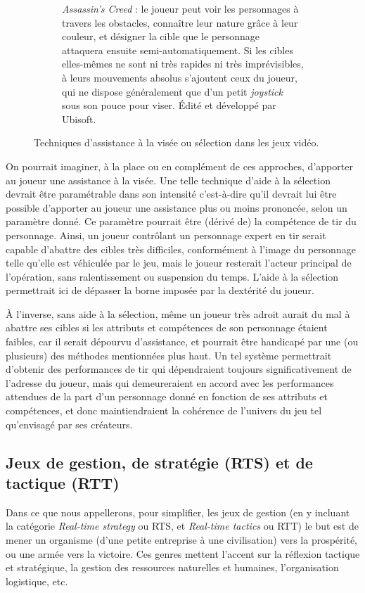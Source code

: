 \begin{figure}[!htbp]
\begin{subfigure}[t]{0.50\textwidth}
			\caption[Système \emph{Eagle Vision} dans le jeu \emph{Assassin's Creed}] {\emph{Assassin's Creed} : le joueur peut voir les personnages à travers les obstacles, connaître leur nature grâce à leur couleur, et désigner la cible que le personnage attaquera ensuite semi-automatiquement. Si les cibles elles-mêmes ne sont ni très rapides ni très imprévisibles, à leurs mouvements absolus s'ajoutent ceux du joueur, qui ne dispose généralement que d'un petit \emph{joystick} sous son pouce pour viser. Édité et développé par Ubisoft.}
			\label{fig:ac_ev}
		\end{subfigure}
		\label{fig:gamesTargeting}
		\caption{Techniques d'assistance à la visée ou sélection dans les jeux vidéo.}
	\end{figure}
	
	On pourrait imaginer, à la place ou en complément de ces approches, d'apporter au joueur une assistance à la visée. Une telle technique d'aide à la sélection devrait être paramétrable dans son \og intensité \fg{} c'est-à-dire qu'il devrait lui être possible d'apporter au joueur une assistance plus ou moins prononcée, selon un paramètre donné. Ce paramètre pourrait être (dérivé de) la compétence de tir du personnage. Ainsi, un joueur contrôlant un personnage expert en tir serait capable d'abattre des cibles très difficiles, conformément à l'image du personnage telle qu'elle est véhiculée par le jeu, mais le joueur resterait l'acteur principal de l'opération, sans ralentissement ou suspension du temps. L'aide à la sélection permettrait ici de dépasser la \og borne \fg{} imposée par la dextérité du joueur.
	
	À l'inverse, sans aide à la sélection, même un joueur très adroit aurait du mal à abattre ses cibles si les attributs et compétences de son personnage étaient faibles, car il serait dépourvu d'assistance, et pourrait être handicapé par une (ou plusieurs) des méthodes mentionnées plus haut. Un tel système permettrait d'obtenir des performances de tir qui dépendraient toujours significativement de l'adresse du joueur, mais qui demeureraient en accord avec les performances attendues de la part d'un personnage donné en fonction de ses attributs et compétences, et donc maintiendraient la cohérence de l'univers du jeu tel qu'envisagé par ses créateurs.	
	
	\subsection{Jeux de gestion, de stratégie (RTS) et de tactique (RTT)}
	Dans ce que nous appellerons, pour simplifier, les jeux de gestion (en y incluant la catégorie \emph{Real-time strategy} ou RTS, et \emph{Real-time tactics} ou RTT) le but est de mener un organisme (d'une petite entreprise à une civilisation) vers la prospérité, ou une armée vers la victoire. Ces genres mettent l'accent sur la réflexion tactique et stratégique, la gestion des ressources naturelles et humaines, l'organisation logistique, etc.

